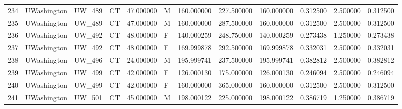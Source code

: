 \begin{tabular}{llllrlrrrrrr}
234    &     UWashington &       UW\_489 &                 CT &  47.000000 &        M &       160.000000 &    227.500000 &  160.000000 &               0.312500 &            2.500000 &          0.312500 \\
235    &     UWashington &       UW\_489 &                 CT &  47.000000 &        M &       160.000000 &    287.500000 &  160.000000 &               0.312500 &            2.500000 &          0.312500 \\
236    &     UWashington &       UW\_492 &                 CT &  48.000000 &        F &       140.000259 &    248.750000 &  140.000259 &               0.273438 &            1.250000 &          0.273438 \\
237    &     UWashington &       UW\_492 &                 CT &  48.000000 &        F &       169.999878 &    292.500000 &  169.999878 &               0.332031 &            2.500000 &          0.332031 \\
238    &     UWashington &       UW\_496 &                 CT &  24.000000 &        M &       195.999741 &    237.500000 &  195.999741 &               0.382812 &            2.500000 &          0.382812 \\
239    &     UWashington &       UW\_499 &                 CT &  42.000000 &        F &       126.000130 &    175.000000 &  126.000130 &               0.246094 &            2.500000 &          0.246094 \\
240    &     UWashington &       UW\_499 &                 CT &  42.000000 &        F &       160.000000 &    365.000000 &  160.000000 &               0.312500 &            2.500000 &          0.312500 \\
241    &     UWashington &       UW\_501 &                 CT &  45.000000 &        M &       198.000122 &    225.000000 &  198.000122 &               0.386719 &            1.250000 &          0.386719 \\
\bottomrule
\end{tabular}
